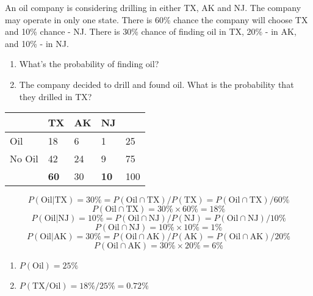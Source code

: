 \documentclass{homework}
\begin{document}
\newpage
\begin{problem}[5]
    An oil company is considering drilling in either TX, AK and NJ. The company may operate in only one state. There is 60\% chance the company will choose TX and 10\% chance - NJ. There is 30\% chance of finding oil in TX, 20\% - in AK, and 10\% - in NJ.

    \begin{enumerate}
        \item What's the probability of finding oil?
        \item The company decided to drill and found oil. What is the probability that they drilled in TX?
    \end{enumerate}

\end{problem}

\begin{solution}
    \begin{table}[h]
        \centering
        \begin{tabular}{@{}l|l|l|l|l@{}}
        & TX & AK & NJ & \\
        \midrule
        Oil & 18 & 6 & 1 & 25\\
        No Oil & 42 & 24 & 9 & 75\\
        \midrule
        & \textbf{60} &  30 & \textbf{10} & 100
        \end{tabular}
    \end{table}

    $$ 
    P(\text{Oil} | \text{TX}) = 30 \% = P(\text{Oil} \cap \text{TX})/P(\text{TX}) = P(\text{Oil} \cap \text{TX})/60 \%
    $$
    $$
    P(\text{Oil} \cap \text{TX}) = 30 \% \times 60 \% = 18\%
    $$
    $$ 
    P(\text{Oil} | \text{NJ}) = 10 \% = P(\text{Oil} \cap \text{NJ})/P(\text{NJ}) = P(\text{Oil} \cap \text{NJ})/10 \%
    $$
    $$
    P(\text{Oil} \cap \text{NJ}) = 10 \% \times 10 \% = 1\%
    $$
    $$ 
    P(\text{Oil} | \text{AK}) = 30 \% = P(\text{Oil} \cap \text{AK})/P(\text{AK}) = P(\text{Oil} \cap \text{AK})/20 \%
    $$
    $$
    P(\text{Oil} \cap \text{AK}) = 30 \% \times 20 \% = 6\%
    $$

    \begin{enumerate}
        \item $P(\text{Oil}) = 25\%$
        \item $P(\text{TX}/\text{Oil}) = 18\%/25\% = 0.72\%$
    \end{enumerate}

\end{solution}
\end{document}
